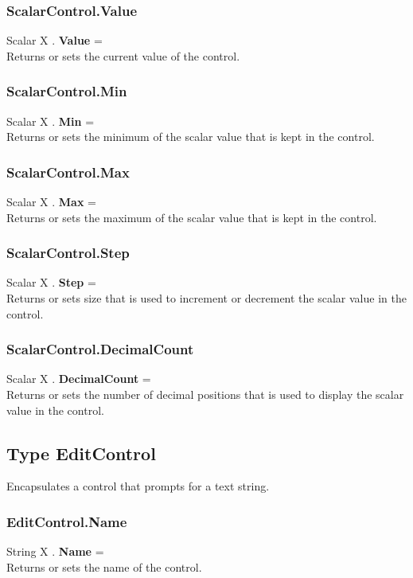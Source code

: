 \subsubsection{ScalarControl.Value \label{F:ScalarControl:Value}}
Scalar X . \textbf{Value} = \\
Returns or sets the current value of the control.

\subsubsection{ScalarControl.Min \label{F:ScalarControl:Min}}
Scalar X . \textbf{Min} = \\
Returns or sets the minimum of the scalar value that is kept in the control.

\subsubsection{ScalarControl.Max \label{F:ScalarControl:Max}}
Scalar X . \textbf{Max} = \\
Returns or sets the maximum of the scalar value that is kept in the control.

\subsubsection{ScalarControl.Step \label{F:ScalarControl:Step}}
Scalar X . \textbf{Step} = \\
Returns or sets size that is used to increment or decrement the scalar value in the control.

\subsubsection{ScalarControl.DecimalCount \label{F:ScalarControl:DecimalCount}}
Scalar X . \textbf{DecimalCount} = \\
Returns or sets the number of decimal positions that is used to display the scalar value in the control.

\subsection{Type EditControl \label{T:EditControl}}
Encapsulates a control that prompts for a text string.

\subsubsection{EditControl.Name \label{F:EditControl:Name}}
String X . \textbf{Name} = \\
Returns or sets the name of the control.

